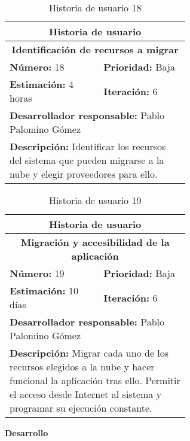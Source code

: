\begin{table}[H]
        \centering
        \begin{tabular}{|p{0.3\linewidth}|p{0.3\linewidth}|}
          \hline
          \multicolumn{2}{|c|}{Historia de usuario}\\ \hline
          \multicolumn{2}{|c|}{\textbf{Identificación de recursos a migrar}}\\ \hline
          \textbf{Número:} 18 & \textbf{Prioridad:} Baja\\ \hline
          \textbf{Estimación:} 4 horas & \textbf{Iteración:} 6\\ \hline
          \multicolumn{2}{|l|}{\textbf{Desarrollador responsable:} Pablo Palomino Gómez}\\ \hline
          \multicolumn{2}{|p{0.6\linewidth}|}{\textbf{Descripción:} Identificar los recursos del sistema que pueden migrarse a la nube y elegir proveedores para ello.}\\ \hline
        \end{tabular}
        \caption{Historia de usuario 18}
        \label{tab:hist18}
\end{table}
\begin{table}[H]
        \centering
        \begin{tabular}{|p{0.3\linewidth}|p{0.3\linewidth}|}
          \hline
          \multicolumn{2}{|c|}{Historia de usuario}\\ \hline
          \multicolumn{2}{|c|}{\textbf{Migración y accesibilidad de la aplicación}}\\ \hline
          \textbf{Número:} 19 & \textbf{Prioridad:} Baja\\ \hline
          \textbf{Estimación:} 10 días & \textbf{Iteración:} 6\\ \hline
          \multicolumn{2}{|l|}{\textbf{Desarrollador responsable:} Pablo Palomino Gómez}\\ \hline
          \multicolumn{2}{|p{0.6\linewidth}|}{\textbf{Descripción:} Migrar cada uno de los recursos elegidos a la nube y hacer funcional la aplicación tras ello. Permitir el acceso desde Internet al sistema y programar su ejecución constante.}\\ \hline
        \end{tabular}
        \caption{Historia de usuario 19}
        \label{tab:hist19}
\end{table}
\textbf{Desarrollo}\\



